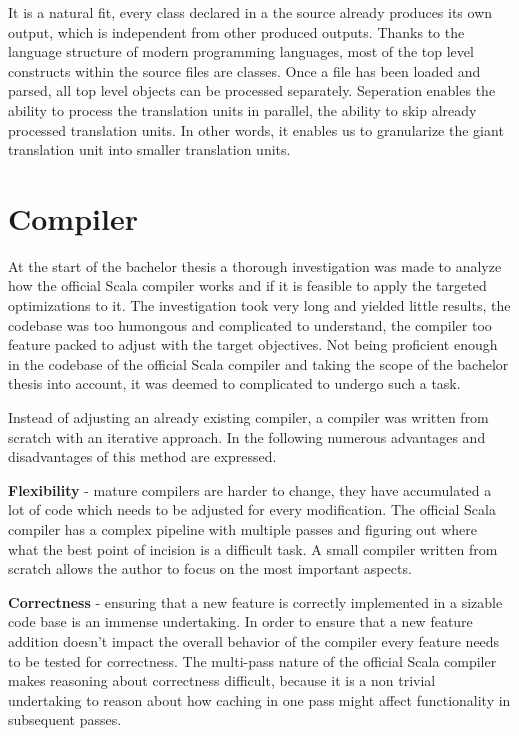 \documentclass{VUMIFPSbakalaurinis}
\begin{document}
It is a natural fit, every class declared in a the source already produces its own output, which is independent from other produced outputs.
Thanks to the language structure of modern programming languages, most of the top level constructs within the source files are classes.
Once a file has been loaded and parsed, all top level objects can be processed separately.
Seperation enables the ability to process the translation units in parallel, the ability to skip already processed translation units. In other words, it enables us to granularize the giant translation unit into smaller translation units.

\section{Compiler}
At the start of the bachelor thesis a thorough investigation was made to analyze how the official Scala compiler works \cite{ScalaGithub} and if it is feasible to apply the targeted optimizations to it.
The investigation took very long and yielded little results, the codebase was too humongous and complicated to understand, the compiler too feature packed to adjust with the target objectives.
Not being proficient enough in the codebase of the official Scala compiler and taking the scope of the bachelor thesis into account, it was deemed to complicated to undergo such a task.

Instead of adjusting an already existing compiler, a compiler was written from scratch with an iterative approach.
In the following numerous advantages and disadvantages of this method are expressed.

\textbf{Flexibility} - mature compilers are harder to change, they have accumulated a lot of code which needs to be adjusted for every modification.
The official Scala compiler has a complex pipeline with multiple passes and figuring out where what the best point of incision is a difficult task.
A small compiler written from scratch allows the author to focus on the most important aspects.

\textbf{Correctness} - ensuring that a new feature is correctly implemented in a sizable code base is an immense undertaking.
In order to ensure that a new feature addition doesn't impact the overall behavior of the compiler every feature needs to be tested for correctness.
The multi-pass nature of the official Scala compiler makes reasoning about correctness difficult, because it is a non trivial undertaking to reason about how caching in one pass might affect functionality in subsequent passes.
\end{document}

